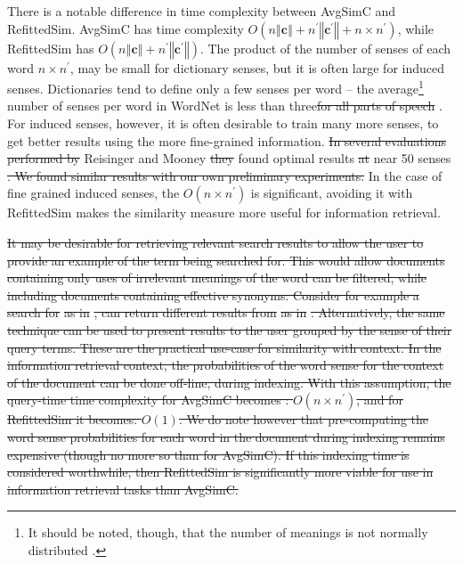 \documentclass{article} %
\def\parencite{\cite} %
\renewcommand{\c}{\mathbf{c}}
\newcommand{\wordquote}[1]{\enquote{\texttt{#1}}}
\providecommand{\DIFadd}[1]{{\protect\color{blue}\uwave{#1}}} %
\providecommand{\DIFdel}[1]{{\protect\color{red}\sout{#1}}}                      %
\providecommand{\DIFaddbegin}{} %
\providecommand{\DIFaddend}{} %
\providecommand{\DIFdelbegin}{} %
\providecommand{\DIFdelend}{} %
\begin{document}
There is a notable difference in time complexity between AvgSimC and RefittedSim.
AvgSimC has time complexity $O(n\left\Vert \c\right\Vert +n^{\prime}\left\Vert \c^{\prime}\right\Vert +n\times n^{\prime})$,
while RefittedSim has $O(n\left\Vert \c\right\Vert +n^{\prime}\left\Vert \c^{\prime}\right\Vert)$.
The product of the number of senses of each word $n \times n^\prime$, may be small for dictionary senses, but it is often large for induced senses. Dictionaries tend to define only a few senses per word -- the average\footnote{It should be noted, though, that the number of meanings is not normally distributed \parencite{zipf1945meaning}.} number of senses per word in WordNet is less than three\DIFdelbegin \DIFdel{for all parts of speech }\DIFdelend \parencite{miller1995wordnet}. For induced senses, however, it is often desirable to train many more senses, to get better results using the more fine-grained information. \DIFdelbegin \DIFdel{In several evaluations performed by }\DIFdelend Reisinger and Mooney \DIFdelbegin \DIFdel{they }\DIFdelend \DIFaddbegin {} \DIFaddend found optimal results \DIFdelbegin \DIFdel{at }\DIFdelend \DIFaddbegin \DIFadd{in several evaluations }\DIFaddend near 50 senses\DIFdelbegin %
\DIFdel{.
We found similar results with our own preliminary experiments.
}\DIFdelend \DIFaddbegin \DIFadd{.
}\DIFaddend In the case of fine grained induced senses, the $O(n \times n^\prime)$ is significant, avoiding it with RefittedSim makes the similarity measure more useful for information retrieval.

\DIFdelbegin \DIFdel{It may be desirable for retrieving relevant search results to allow the user to provide an example of the term being searched for. This would allow documents containing only uses of irrelevant meanings of the word can be filtered, while  including documents containing effective synonyms. Consider for example a search for }%
\DIFdel{as in }%
\DIFdel{, can return different results from }%
\DIFdel{as in }%
\DIFdel{. 
Alternatively, the same technique can be used to present results to the user grouped by the sense of their query terms.
These are the practical use-case for similarity with context.
In the information retrieval context, the probabilities of the word sense for the context of the document can be done off-line, during indexing. With this assumption, the query-time time complexity for AvgSimC becomes : $O(n\times n^{\prime})$, and for RefittedSim it becomes: $O(1)$.
We do note however that pre-computing the word sense probabilities for each word in the document during indexing remains expensive (though no more so than for AvgSimC). If this indexing time is considered worthwhile, then RefittedSim is significantly more viable for use in information retrieval tasks than AvgSimC.
}%
\end{document}
